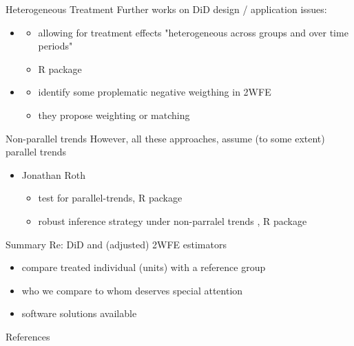 \documentclass[aspectratio=169]{beamer}
\begin{document}
		\begin{frame}{Heterogeneous Treatment}
			Further works on DiD design / application issues:
			\\ \vspace*{.25cm}
			\begin{itemize}
				\item \cite{DeChaisemartin2018}
				\begin{itemize}
					\item allowing for treatment effects "heterogeneous across groups and over time periods"
					\item R package \href{https://cran.r-project.org/web/packages/DIDmultiplegt/index.html}{\underline{}}
				\end{itemize}
				\item \cite{Imai2020}
				\begin{itemize}
					\item identify some proplematic negative weigthing in 2WFE
					\item they propose weighting or matching \href{https://imai.fas.harvard.edu/research/twoway.html}{\underline{}}
				\end{itemize}
			\end{itemize}
		\end{frame}

		\begin{frame}{Non-parallel trends}
			However, all these approaches, assume (to some extent) parallel trends
			\\ \vspace*{.25cm}
			\begin{itemize}
				\item Jonathan Roth \citeyear{Roth2021}
					\begin{itemize}
						\item test for parallel-trends, R package \href{https://github.com/jonathandroth/pretrends}{\underline{}}
						\item robust inference strategy under non-parralel trends \cite{Rambachan2020}, R package \href{https://github.com/asheshrambachan/HonestDiD}{\underline{}}
					\end{itemize}
			\end{itemize}
		\end{frame}

		\begin{frame}{Summary}
			Re: DiD and (adjusted) 2WFE estimators \\ \vspace*{.5cm}
			\begin{itemize}
				\item compare treated individual (units) with a reference group
				\item who we compare to whom deserves special attention
				\item software solutions available
			\end{itemize}
		\end{frame}

	\begin{frame}[t,allowframebreaks]{References}
	  \printbibliography
	\end{frame}
\end{document}
